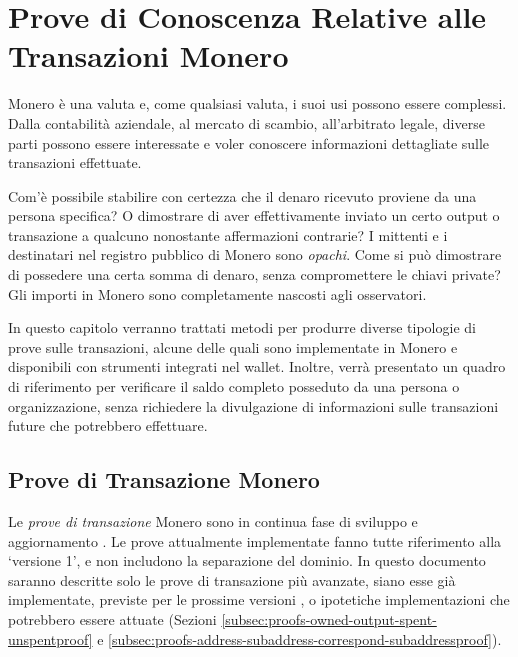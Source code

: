 \chapter{Prove di Conoscenza Relative alle Transazioni Monero}
\label{chapter:tx-knowledge-proofs}

\iffalse
https://github.com/monero-project/monero/pull/6329/files

https://monero.stackexchange.com/questions/8122/what-is-the-spendproofv1-or-outproofv1-in-the-details-of-a-sent-transa

https://monero.stackexchange.com/questions/9991/how-does-the-get-reserve-proof-command-work

https://github.com/monero-project/research-lab/issues/68
\fi

Monero è una valuta e, come qualsiasi valuta, i suoi usi possono essere complessi. Dalla contabilità aziendale, al mercato di scambio, all’arbitrato legale, diverse parti possono essere interessate e voler conoscere informazioni dettagliate sulle transazioni effettuate.

Com'è possibile stabilire con certezza che il denaro ricevuto proviene da una persona specifica? O dimostrare di aver effettivamente inviato un certo output o transazione a qualcuno nonostante affermazioni contrarie? I mittenti e i destinatari nel registro pubblico di Monero sono \emph{opachi}. Come si può dimostrare di possedere una certa somma di denaro, senza compromettere le chiavi private? Gli importi in Monero sono completamente nascosti agli osservatori.

In questo capitolo verranno trattati metodi per produrre diverse tipologie di prove sulle transazioni, alcune delle quali sono implementate in Monero e disponibili con strumenti integrati nel wallet. Inoltre, verrà presentato un quadro di riferimento per verificare il saldo completo posseduto da una persona o organizzazione, senza richiedere la divulgazione di informazioni sulle transazioni future che potrebbero effettuare.



\section{Prove di Transazione Monero}
\label{sec:proofs-monero-proofs}

Le \emph{prove di transazione} Monero sono in continua fase di sviluppo e aggiornamento \cite{sarang-txproofs-updates-issue}. Le prove attualmente implementate fanno tutte riferimento alla `versione 1', e non includono la separazione del dominio. In questo documento saranno descritte solo le prove di transazione più avanzate, siano esse già implementate, previste per le prossime versioni \cite{sarang-txproofs-v2-update-pr}, o ipotetiche implementazioni che potrebbero essere attuate (Sezioni \ref{subsec:proofs-owned-output-spent-unspentproof} \cite{unspent-proof-issue-68} e \ref{subsec:proofs-address-subaddress-correspond-subaddressproof}).


